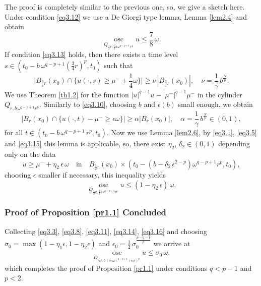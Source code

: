 \documentclass[a4paper,11pt,fullpage]{article}
\DeclareMathOperator*{\osc}{osc}
\numberwithin{equation}{section}
\begin{document}
The proof is completely similar to the previous one, so, we give a sketch here.
Under condition \eqref{eq3.12} we use a De Giorgi type lemma, Lemma \ref{lem2.4} and obtain
\begin{equation}\label{eq3.14}
\osc\limits_{Q_{\frac{1}{2} r, \frac{1}{2} b\, \omega^{q-p+1}\,r^p}} u\leqslant \frac{7}{8}\,\omega.
\end{equation}
If condition \eqref{eq3.13} holds, then there exists a time level $s\in (t_0-b\,\omega^{q-p+1}(\frac{3}{4}r)^p, t_0)$ such that
\begin{equation*}
\big|B_{\frac{3}{4} r}(x_0)\cap \big\{u(\cdot, s)\geqslant \mu^-+\frac{1}{4}\omega\big\}\big|\geqslant \nu\,|B_{\frac{3}{4}r}(x_0)|,\quad \nu=\frac{1}{\gamma}\,b^{\frac{N}{p}}.
\end{equation*}
We use Theorem \ref{th1.2} for the function $|u|^{q-1}u- |\mu^-|^{q-1}\mu^-$ in the cylinder $Q_{r, b\,\omega^{q-p+1}r^p}$. Similarly  to \eqref{eq3.10},
choosing $b$ and $\epsilon(b)$ small enough, we obtain
\begin{equation}\label{eq3.15}
|B_r(x_0)\cap\{u(\cdot, t)-\mu^-\geqslant \epsilon \omega\}|\geqslant \alpha |B_r(x_0)|,\quad \alpha=
\frac{1}{\gamma}\,b^{\frac{N}{p}}\in (0, 1),
\end{equation}
for all $t\in (t_0-b\,\omega^{q-p+1}\,r^p, t_0)$. Now we use Lemma \ref{lem2.6}, by \eqref{eq3.1}, \eqref{eq3.5} and \eqref{eq3.15} this lemma is applicable, so, there exist $\eta_2$, $\delta_2 \in (0, 1)$ depending only on the data
\begin{equation*}
u\geqslant \mu^-+\eta_2\,\epsilon\,\omega\quad \text{in}\quad B_{\frac{1}{2}r}(x_0)\times (t_0-(b-\delta_2\,\epsilon^{2-p})\omega^{q-p+1} r^p, t_0),
\end{equation*}
choosing $\epsilon$ smaller if necessary, this  inequality yields
\begin{equation}\label{eq3.16}
\osc\limits_{Q_{\frac{1}{2}r, \frac{1}{2} b\,\omega^{q-p+1} r^p}} u\leqslant (1-\eta_2\,\epsilon)\,\omega.
\end{equation}

\subsubsection{Proof of Proposition \ref{pr1.1} Concluded}

Collecting \eqref{eq3.3}, \eqref{eq3.8}, \eqref{eq3.11}, \eqref{eq3.14}, \eqref{eq3.16} and choosing $\sigma_0=\max(1-\eta_1\epsilon, 1-\eta_2 \epsilon)$ and $\epsilon_0=\frac{1}{2}\,\sigma^{\frac{p-q-1}{p}}_0$ we arrive at
\begin{equation}\label{eq3.17}
\osc\limits_{Q_{\epsilon_0 r, b\,(\sigma_0 \omega)^{q-p+1} (\epsilon_0 r)^p}} u \leqslant \sigma_0\,\omega,
\end{equation}
which  completes the proof of Proposition \ref{pr1.1} under conditions $q<p-1$ and $p<2$.
\end{document}

